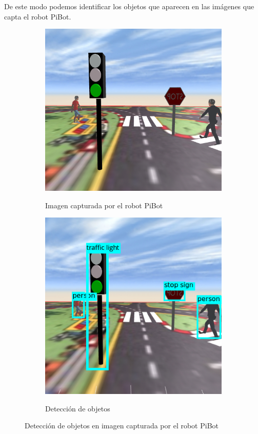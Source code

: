 \documentclass{report}
\begin{document}
De este modo podemos identificar los objetos que aparecen en las imágenes que capta el robot PiBot.


\renewcommand{\figurename}{Figura}		
\begin{figure}[!h]
\centering
  \begin{subfigure}[b]{0.49\textwidth}
  \centering
    \includegraphics[scale=0.342]{images/cap4/sin-deteccion.jpg}
    \label{fig:f1}
    \caption{Imagen capturada por el robot PiBot}
  \end{subfigure}
  \hfill
  \begin{subfigure}[b]{0.49\textwidth}
  \centering
    \includegraphics[scale=0.4]{images/cap4/con-detection.jpg}
    \label{fig:f2}
    \caption{Detección de objetos}
  \end{subfigure}
  \caption{Detección de objetos  en imagen capturada por el robot PiBot}
\end{figure}
\end{document}
